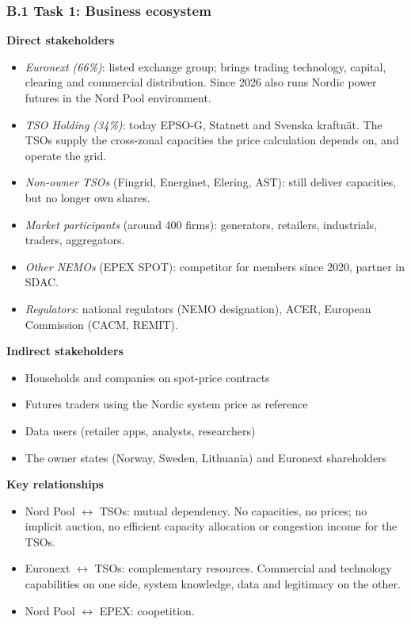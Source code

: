 \subsubsection*{B.1 Task 1: Business ecosystem}
\label{app:B1}
\begin{aiout}
\textbf{Direct stakeholders}
\begin{itemize}
  \item \emph{Euronext (66\%)}: listed exchange group; brings trading technology, capital, clearing and commercial distribution. Since 2026 also runs Nordic power futures in the Nord Pool environment.
  \item \emph{TSO Holding (34\%)}: today EPSO-G, Statnett and Svenska kraftnät. The TSOs supply the cross-zonal capacities the price calculation depends on, and operate the grid.
  \item \emph{Non-owner TSOs} (Fingrid, Energinet, Elering, AST): still deliver capacities, but no longer own shares.
  \item \emph{Market participants} (around 400 firms): generators, retailers, industrials, traders, aggregators.
  \item \emph{Other NEMOs} (EPEX SPOT): competitor for members since 2020, partner in SDAC.
  \item \emph{Regulators}: national regulators (NEMO designation), ACER, European Commission (CACM, REMIT).
\end{itemize}
\textbf{Indirect stakeholders}
\begin{itemize}
  \item Households and companies on spot-price contracts
  \item Futures traders using the Nordic system price as reference
  \item Data users (retailer apps, analysts, researchers)
  \item The owner states (Norway, Sweden, Lithuania) and Euronext shareholders
\end{itemize}
\textbf{Key relationships}
\begin{itemize}
  \item Nord Pool $\leftrightarrow$ TSOs: mutual dependency. No capacities, no prices; no implicit auction, no efficient capacity allocation or congestion income for the TSOs.
  \item Euronext $\leftrightarrow$ TSOs: complementary resources. Commercial and technology capabilities on one side, system knowledge, data and legitimacy on the other.
  \item Nord Pool $\leftrightarrow$ EPEX: coopetition.

\end{itemize}
\end{aiout}
